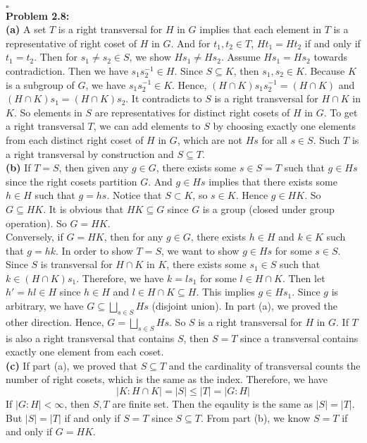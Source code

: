 \documentclass[12pt]{amsart}
\begin{document}
    \\\phantom{qed}\hfill$\square$\\
    \textbf{Problem 2.8:}\\
    \textbf{(a)} A set $T$ is a right transversal for $H$ in $G$ implies that each element in $T$ is a representative of right coset of $H$ in $G$. And for $t_1,t_2\in T$, $Ht_1=Ht_2$ if and only if $t_1=t_2$. Then for $s_1\neq s_2\in S$, we show $Hs_1\neq Hs_2$. Assume $Hs_1=Hs_2$ towards contradiction. Then we have $s_1s_2^{-1}\in H$. Since $S\subseteq K$, then $s_1,s_2\in K$. Because $K$ is a subgroup of $G$, we have $s_1s_2^{-1}\in K$. Hence, $(H\cap K)s_1s_2^{-1}=(H\cap K)$ and $(H\cap K)s_1=(H\cap K)s_2$. It contradicts to $S$ is a right transversal for $H\cap K$ in $K$. So elements in $S$ are representatives for distinct right cosets of $H$ in $G$. To get a right transversal $T$, we can add elements to $S$ by choosing exactly one elements from each distinct right coset of $H$ in $G$, which are not $Hs$ for all $s\in S$. Such $T$ is a right transversal by construction and $S\subseteq T$.\\
    \textbf{(b)} If $T=S$, then given any $g\in G$, there exists some $s\in S=T$ such that $g\in Hs$ since the right cosets partition $G$. And $g\in Hs$ implies that there exists some $h\in H$ such that $g=hs$. Notice that $S\subset K$, so $s\in K$. Hence $g\in HK$. So $G\subseteq HK$. It is obvious that $HK\subseteq G$ since $G$ is a group (closed under group operation). So $G=HK$.\\
    Conversely, if $G=HK$, then for any $g\in G$, there exists $h\in H$ and $k\in K$ such that $g=hk$. In order to show $T=S$, we want to show $g\in Hs$ for some $s\in S$. Since $S$ is transversal for $H\cap K$ in $K$, there exists some $s_1\in S$ such that $k\in (H\cap K)s_1$. Therefore, we have $k=ls_1$ for some $l\in H\cap K$. Then let $h'=hl\in H$ since $h\in H$ and $l\in H\cap K\subseteq H$. This implies $g\in Hs_1$. Since $g$ is arbitrary, we have $G\subseteq \bigsqcup_{s\in S}Hs$ (disjoint union). In part (a), we proved the other direction. Hence, $G=\bigsqcup_{s\in S}Hs$. So $S$ is a right transversal for $H$ in $G$. If $T$ is also a right transversal that contains $S$, then $S=T$ since a transversal contains exactly one element from each coset.\\
    \textbf{(c)} If part (a), we proved that $S\subseteq T$ and the cardinality of transversal counts the number of right cosets, which is the same as the index. Therefore, we have 
    \[|K:H\cap K|=|S|\leq |T|=|G:H|\]
    If $|G:H|< \infty$, then $S,T$ are finite set. Then the eqaulity is the same as $|S|=|T|$. But $|S|=|T|$ if and only if $S=T$ since $S\subseteq T$. From part (b), we know $S=T$ if and only if $G=HK$.\\
\end{document}

